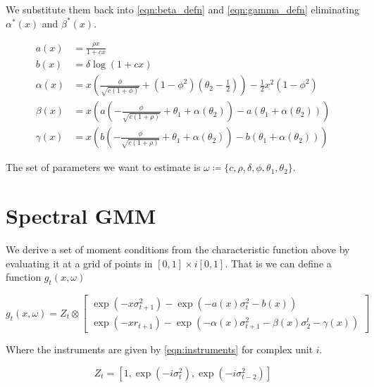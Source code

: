 \documentclass[11pt]{article}
\begin{document}
We substitute them back into \cref{eqn:beta_defn} and \cref{eqn:gamma_defn} eliminating $\alpha^{*}(x)$ and
$\beta^{*}(x)$.

\begin{align}
    a(x) &= \frac{\rho x}{1 + c x} \\ \label{eqn:a(x)}
    b(x) &= \delta \log \left(1 + c x\right) \\ \label{eqn:b(x)}
    \alpha(x) &= x \left(\frac{\phi}{\sqrt{c (1 + \phi)}}  + (1 - \phi^2)\left(\theta_2 - \frac{1}{2}\right)\right)
    - \frac{1}{2} x^2 (1 - \phi^2) \\ \label{eqn:alpha(x)}
    \beta(x)  &= x \left(a\left(-\frac{\phi}{\sqrt{c(1+ \rho)}} + \theta_1 + \alpha(\theta_2)\right) -
        a\left(\theta_1 + \alpha(\theta_2)\right)\right) \\ \label{eqn:beta(x)}
    \gamma(x) &= x \left(b\left(-\frac{\phi}{\sqrt{c(1+\rho)}} + \theta_1 + \alpha(\theta_2)\right) -
        b\left(\theta_1 + \alpha(\theta_2)\right) \right)
\end{align}


The set of parameters we want to estimate is $\omega \coloneqq \lbrace c, \rho, \delta, \phi, \theta_1,
\theta_2\rbrace$.

\section{Spectral GMM}

We derive a set of moment conditions from the characteristic function above by evaluating it at a grid of points
in $[0,1] \times i [0,1]$. 
That is we can define a function $g_t(x, \omega)$

\begin{equation}
g_t(x, \omega) = Z_t \otimes \begin{bmatrix} \exp(- x \sigma^2_{t+1}) - \exp\left( - a(x) \sigma_t^2 - b(x)
    \right) \\ \exp\left(- x r_{t+1}\right) - \exp\left(- \alpha(x) \sigma^2_{t+1} - \beta(x) \sigma_2^t -
    \gamma(x)\right) \end{bmatrix}
\end{equation}

Where the instruments are given by \cref{eqn:instruments} for complex unit $i$. 

\begin{equation}
    \label{eqn:instruments}
    Z_t = \left[1, \exp\left(- i \sigma_t^2\right), \exp\left(-i \sigma^2_{t-2}\right)\right] 
\end{equation}
\end{document}
